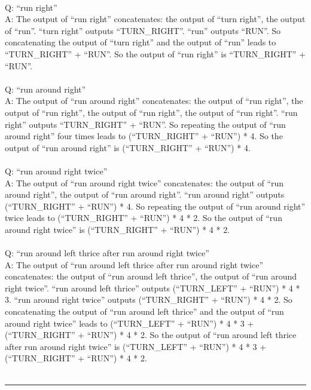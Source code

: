 {\\
Q: ``run right'' \\
A: The output of ``run right'' concatenates: the output of ``turn right'', the output of ``run''. ``turn right'' outputs ``TURN\_RIGHT''. ``run'' outputs ``RUN''. So concatenating the output of ``turn right'' and the output of ``run'' leads to ``TURN\_RIGHT'' + ``RUN''. So the output of ``run right'' is ``TURN\_RIGHT'' + ``RUN''. \\
\\
Q: ``run around right'' \\
A: The output of ``run around right'' concatenates: the output of ``run right'', the output of ``run right'', the output of ``run right'', the output of ``run right''. ``run right'' outputs ``TURN\_RIGHT'' + ``RUN''. So repeating the output of ``run around right'' four times leads to (``TURN\_RIGHT'' + ``RUN'') * 4. So the output of ``run around right'' is (``TURN\_RIGHT'' + ``RUN'') * 4. \\
\\
Q: ``run around right twice'' \\
A: The output of ``run around right twice'' concatenates: the output of ``run around right'', the output of ``run around right''. ``run around right'' outputs (``TURN\_RIGHT'' + ``RUN'') * 4. So repeating the output of ``run around right'' twice leads to (``TURN\_RIGHT'' + ``RUN'') * 4 * 2. So the output of ``run around right twice'' is (``TURN\_RIGHT'' + ``RUN'') * 4 * 2. \\
\\
Q: ``run around left thrice after run around right twice'' \\
A: The output of ``run around left thrice after run around right twice'' concatenates: the output of ``run around left thrice'', the output of ``run around right twice''. ``run around left thrice'' outputs (``TURN\_LEFT'' + ``RUN'') * 4 * 3. ``run around right twice'' outputs (``TURN\_RIGHT'' + ``RUN'') * 4 * 2. So concatenating the output of ``run around left thrice'' and the output of ``run around right twice'' leads to (``TURN\_LEFT'' + ``RUN'') * 4 * 3 + (``TURN\_RIGHT'' + ``RUN'') * 4 * 2. So the output of ``run around left thrice after run around right twice'' is (``TURN\_LEFT'' + ``RUN'') * 4 * 3 + (``TURN\_RIGHT'' + ``RUN'') * 4 * 2. \\
\\
\hrule \bigskip
}

